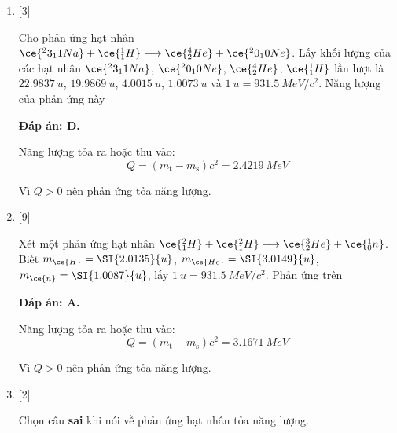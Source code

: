 \begin{enumerate}[label=\bfseries Câu \arabic*:]
	\item {} [3]
	\cauhoi
	{Cho phản ứng hạt nhân $\ce{^23_11 Na} + \ce{^1_1 H} \longrightarrow \ce{^4_2 He} + \ce{^20_10 Ne}$. Lấy khối lượng của các hạt nhân $\ce{^23_11 Na}$, $\ce{^20_10 Ne}$, $\ce{^4_2 He}$, $\ce{^1_1 H}$ lần lượt là $\SI{22.9837}{u}$, $\SI{19.9869}{u}$, $\SI{4.0015}{u}$, $\SI{1.0073}{u}$ và $\SI{1}{u} = \SI{931.5}{MeV/c^2}$. Năng lượng của phản ứng này
	}
	
	\loigiai
	{		\textbf{Đáp án: D.}
		
		Năng lượng tỏa ra hoặc thu vào:
		$$Q=(m_{\text{t}} - m_\text{s}) c^2 = \SI{2.4219}{MeV}$$
		
		Vì $Q>0$ nên phản ứng tỏa năng lượng.
	}
	\item {} [9]
	\cauhoi
	{Xét một phản ứng hạt nhân $\ce{^2_1 H} + \ce{^2_1 H} \longrightarrow \ce{^3_2 He} + \ce{^1_0 n}$. Biết $m_{\ce{H}} = \SI{2.0135}{u}$, $m_{\ce{He}} = \SI{3.0149}{u}$, $m_{\ce{n}} = \SI{1.0087}{u}$, lấy $\SI{1}{u} = \SI{931.5}{MeV/c^2}$. Phản ứng trên
	}
	
	\loigiai
	{		\textbf{Đáp án: A.}
		
		Năng lượng tỏa ra hoặc thu vào:
		$$Q=(m_{\text{t}} - m_\text{s}) c^2 = \SI{3.1671}{MeV}$$
		
		Vì $Q>0$ nên phản ứng tỏa năng lượng.
	}

\item {} [2]
\cauhoi
{Chọn câu \textbf{sai} khi nói về phản ứng hạt nhân tỏa năng lượng.
}


\end{enumerate}
